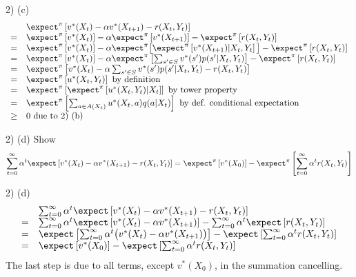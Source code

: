 \documentclass[11pt,a4paper]{article}
\begin{document}
\begin{answer}{2) (c)}
  \[\begin{array}{rl}
    &\expect^\pi\left[v^*(X_t)-\alpha v^*(X_{t+1})-r(X_t,Y_t)\right]\\
    =&\expect^\pi\left[v^*(X_t)\right]-\alpha\expect^\pi\left[v^*(X_{t+1})\right]-\expect^\pi\left[r(X_t,Y_t)\right]\\
    =&\expect^\pi\left[v^*(X_t)\right]-\alpha\expect^\pi\big[\expect^\pi\left[v^*(X_{t+1})|X_t,Y_t\right]\big]-\expect^\pi\left[r(X_t,Y_t)\right]\\
    =&\expect^\pi\left[v^*(X_t)\right]-\alpha\expect^\pi\left[\sum_{s'\in S}v^*(s')p(s'|X_t,Y_t)\right]-\expect^\pi\left[r(X_t,Y_t)\right]\\
    =&\expect^\pi\left[v^*(X_t)-\alpha\sum_{s'\in S}v^*(s')p(s'|X_t,Y_t)-r(X_t,Y_t)\right]\\
    =&\expect^\pi\left[u^*(X_t,Y_t)\right]\text{ by definition}\\
    =&\expect^\pi\left[\expect^\pi\left[u^*(X_t,Y_t)|X_t\right]\right]\text{ by tower property}\\
    =&\expect^\pi\left[\sum_{a\in A(X_t)}u^*(X_t,a)q(a|X_t)\right]\text{ by def. conditional expectation}\\
    \geq&0\text{ due to 2) (b)}
  \end{array}\]
\end{answer}

\begin{question}{2) (d)}
  Show
  \[ \sum_{t=0}^\infty\alpha^t\expect\left[v^*(X_t)-\alpha v^*(X_{t+1})-r(X_t,Y_t)\right]=\expect^\pi\left[v^*(X_0)\right]-\expect^\pi\left[\sum_{t=0}^\infty\alpha^tr(X_t,Y_t)\right] \]
\end{question}

\begin{answer}{2) (d)}
  \[\begin{array}{rl}
    &\sum_{t=0}^\infty\alpha^t\expect\left[v^*(X_t)-\alpha v^*(X_{t+1})-r(X_t,Y_t)\right]\\
    =&\sum_{t=0}^\infty\alpha^t\expect\left[v^*(X_t)-\alpha v^*(X_{t+1})\right]-\sum_{t=0}^\infty\alpha^t\expect\left[r(X_t,Y_t)\right]\\
    =&\expect\left[\sum_{t=0}^\infty\alpha^t\big(v^*(X_t)-\alpha v^*(X_{t+1})\big)\right]-\expect\left[\sum_{t=0}^\infty\alpha^tr(X_t,Y_t)\right]\\
    =&\expect\left[v^*(X_0)\right]-\expect\left[\sum_{t=0}^\infty\alpha^tr(X_t,Y_t)\right]
  \end{array}\]
  The last step is due to all terms, except $v^*(X_0)$, in the summation cancelling.
\end{answer}
\end{document}
